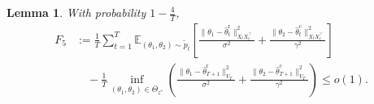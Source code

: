 \documentclass[accepted]{uai2025} %
\theoremstyle{plain}
\newtheorem{lemma}[theorem]{Lemma}
\theoremstyle{definition}
\theoremstyle{remark}
\begin{document}
\begin{lemma}
    \label{lem:Regret_F5}
    With probability $1-\frac{4}{T}$,
    \begin{align*}
        F_5 &:= \frac{1}{T} \sum_{t=1}^{T} \mathbb{E}_{(\theta_1, \theta_2) \sim \tilde{p}_t} 
        \left[  \frac{\|\theta_1 - \hat{\theta}_t^{\mathrm{r}}\|_{X_t X_t^\top}^2}{\sigma^2} 
        + \frac{\|\theta_2 - \hat{\theta}_t^{\mathrm{c}}\|_{X_t X_t^\top}^2}{\gamma^2}  \right] \\
        &\quad - \frac{1}{T} \inf_{(\theta_1, \theta_2) \in \overline{\Theta}_{z^*}} 
        \left( \frac{\|\theta_1 - \hat{\theta}^{\mathrm{r}}_{T + 1}\|_{V_{T}}^2}{\sigma^2} 
        + \frac{\|\theta_2 - \hat{\theta}^{\mathrm{c}}_{T + 1}\|_{V_{T}}^2}{\gamma^2} \right) 
        \le o(1).
    \end{align*}
\end{lemma}
\end{document}
